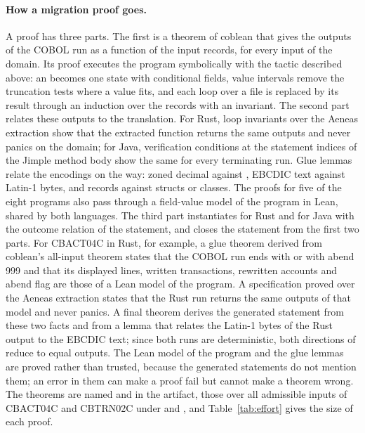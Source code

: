 \paragraph{How a migration proof goes.} A proof has three parts. The first is a theorem of coblean that gives the
outputs of the COBOL run as a function of the input records, for every input of the domain. Its proof executes the
program symbolically with the tactic described above: an  becomes one state with conditional fields, value intervals remove the truncation tests where a value fits, and each loop over a file is replaced by its result through an induction over
the records with an invariant. The second part relates these outputs to the translation. For Rust, loop invariants over
the Aeneas extraction show that the extracted function returns the same outputs and never panics on the domain; for
Java, verification conditions at the statement indices of the Jimple method body show the same for every terminating
run. Glue lemmas relate the encodings on the way: zoned decimal against , EBCDIC text against Latin-1 bytes,
and records against structs or classes. The proofs for five of the eight programs also pass through a field-value model
of the program in Lean, shared by both languages. The third part instantiates  for Rust and  for Java with the outcome relation of the statement,
and closes the statement from the first two parts. For CBACT04C in Rust, for example, a glue theorem derived from
coblean's all-input theorem states that the COBOL run ends with  or with abend 999 and that its displayed
lines, written transactions, rewritten accounts and abend flag are those of a Lean model of the program. A
specification proved over the Aeneas extraction states that the Rust run returns the same outputs of that model and
never panics. A final theorem derives the generated statement from these two facts and from a lemma that relates the
Latin-1 bytes of the Rust output to the EBCDIC text; since both runs are deterministic, both directions of  reduce to equal outputs. The Lean model of
the program and the glue lemmas are proved rather than trusted, because the generated statements do not mention them; an error in them can make a
proof fail but cannot make a theorem wrong. The theorems are named  and
 in the artifact, those over all admissible inputs of CBACT04C and
CBTRN02C under  and , and Table~\ref{tab:effort} gives the size of each proof.

